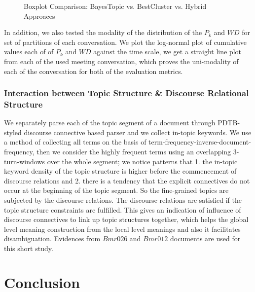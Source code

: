 \documentclass{article}
\begin{document}
\begin{figure}%
    \centering
    \qquad
    \caption{Boxplot Comparison: BayesTopic vs. BestCluster vs. Hybrid Approaces}%
    \label{fig:3boxplot}%

\end{figure}

In addition, we also tested the modality of the distribution of the $P_k$ and $WD$ for set of partitions of each conversation. We plot the log-normal plot of cumulative values each of of $P_k$ and $WD$ against the time scale, we get a straight line plot from each of the used meeting conversation, which proves the uni-modality of each of the conversation for both of the evaluation metrics. 

\subsubsection{Interaction between Topic Structure \& Discourse Relational Structure} We separately parse each of the topic segment of a document through PDTB-styled discourse connective based parser \cite{lin-12} and we collect in-topic keywords. We use a method of collecting all terms on the basis of term-frequency-inverse-document-frequency, then we consider the highly frequent terms using an overlapping 3-turn-windows over the whole segment; we notice patterns that 1. the in-topic keyword density of the topic structure is higher before the commencement of discourse relations and 2. there is a tendency that the explicit connectives do not occur at the beginning of the topic segment. So the fine-grained topics are subjected by the discourse relations. The discourse relations are satisfied if the topic structure constraints are fulfilled. This gives an indication of influence of discourse connectives to link up topic structures together, which helps the global level meaning construction from the local level meanings and also it facilitates disambiguation. Evidences from $Bmr026$ and $Bmr012$ documents are used for this short study. %

 \section{Conclusion}\label{sec:concl}
 
\end{document}
